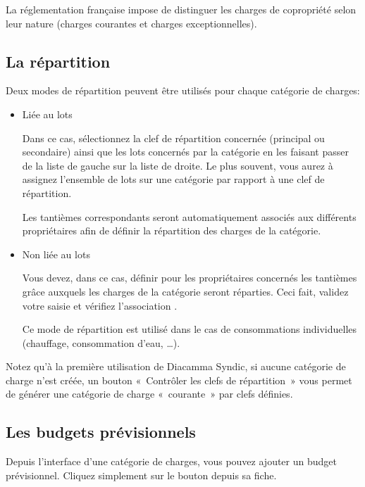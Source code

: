 \documentclass[a4paper,10pt,oneside,french]{sphinxmanual}
\begin{document}
\sphinxAtStartPar
La réglementation française impose de distinguer les charges de copropriété selon leur nature (charges courantes et charges exceptionnelles).


\subsection{La répartition}
\label{\detokenize{condominium/classloads:la-repartition}}
\sphinxAtStartPar
Deux modes de répartition peuvent être utilisés pour chaque catégorie de charges:
\begin{itemize}
\item {} 
\sphinxAtStartPar
Liée au lots

\sphinxAtStartPar
Dans ce cas, sélectionnez la clef de répartition concernée (principal ou secondaire) ainsi que les lots concernés par la catégorie en les faisant passer de la liste de gauche sur la liste de droite.
Le plus souvent, vous aurez à assignez l’ensemble de lots sur une catégorie par rapport à une clef de répartition.

\sphinxAtStartPar
Les tantièmes correspondants seront automatiquement associés aux différents propriétaires afin de définir la répartition des charges de la catégorie.

\item {} 
\sphinxAtStartPar
Non liée au lots

\sphinxAtStartPar
Vous devez, dans ce cas, définir pour les propriétaires concernés les tantièmes grâce auxquels les charges de la catégorie seront réparties.
Ceci fait, validez votre saisie et vérifiez l’association .

\sphinxAtStartPar
Ce mode de répartition est utilisé dans le cas de consommations individuelles (chauffage, consommation d’eau, …).

\end{itemize}

\sphinxAtStartPar
Notez qu’à la première utilisation de Diacamma Syndic, si aucune catégorie de charge n’est créée, un bouton « Contrôler les clefs de répartition » vous permet de générer une catégorie de charge « courante » par clefs définies.


\subsection{Les budgets prévisionnels}
\label{\detokenize{condominium/classloads:les-budgets-previsionnels}}
\sphinxAtStartPar
Depuis l’interface d’une catégorie de charges, vous pouvez ajouter un budget prévisionnel.
Cliquez simplement sur le bouton  depuis sa fiche.
\end{document}
